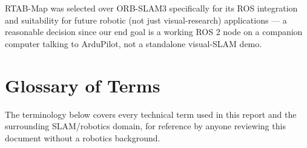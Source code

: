 \documentclass[11pt,a4paper]{article}
\begin{document}
RTAB-Map was selected over ORB-SLAM3 specifically for its ROS integration and suitability for future robotic (not just visual-research) applications --- a reasonable decision since our end goal is a working ROS 2 node on a companion computer talking to ArduPilot, not a standalone visual-SLAM demo.

\newpage

\section{Glossary of Terms}
The terminology below covers every technical term used in this report and the surrounding SLAM/robotics domain, for reference by anyone reviewing this document without a robotics background.
\end{document}
